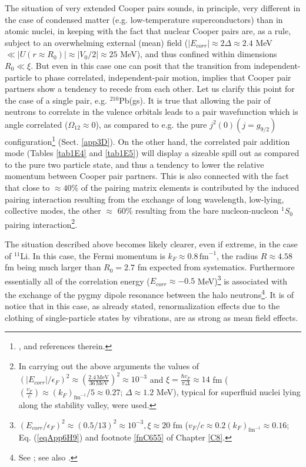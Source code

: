 The situation of very extended Cooper pairs sounds, in principle, very different in the case of condensed matter (e.g. low-temperature superconductors) than in atomic nuclei, in keeping with the fact that nuclear Cooper pairs are, as a rule, subject to an overwhelming external (mean) field ($|E_{corr}|\approx 2\Delta\approx2.4$ MeV $\ll |U(r\approx R_0)|\approx |V_0/2|\approx 25 $ MeV), and thus confined within dimensions $R_0\ll\xi$. But even in this case one can posit that  the transition from independent-particle to phase correlated, independent-pair motion, implies that Cooper pair partners show a tendency to recede from each other. Let us clarify this point for the case of a single pair, e.g. $^{210}$Pb(gs). It is true that allowing the pair of neutrons to correlate in the valence orbitals leads to a pair wavefunction which is angle correlated ($\Omega_{12}\approx 0$), as compared to e.g. the pure $j^2(0)(j=g_{9/2})$ configuration\footnote{\label{C4f17}\cite{Bertsch:67}, \cite{Ferreira:84,Matsuo:13} and references therein.} (Sect. \ref{app3D}). On the other hand, the correlated pair addition mode (Tables \ref{tab1E4} and \ref{tab1E5}) will display a sizeable spill out as compared to the pure two particle state, and thus a tendency to lower the relative momentum  between Cooper pair partners. This is also connected with the fact that close to $\approx 40$\% of the pairing matrix elements is contributed by the induced pairing interaction resulting from the exchange of long wavelength, low-lying, collective modes, the other $\approx$ 60\% resulting from the bare nucleon-nucleon $^1S_0$ pairing interaction\footnote{\label{f17C4} In carrying out the above arguments the values of $(|E_{corr}|/\epsilon_F)^2\approx \left(\frac{2.4 \,\text{MeV}}{36\,\text{MeV}}\right)^2\approx 10^{-3}$ and $\xi=\frac{\hbar v_F}{\pi\Delta}\approx 14$ fm ($(\frac{v_F}{c})\approx (k_F)_{\text{fm}^{-1}}/5\approx 0.27$; $\Delta\approx 1.2$ MeV), typical for superfluid nuclei lying along the stability valley, were used.}. 


The situation described above becomes likely clearer, even if extreme, in the case of $^{11}$Li. In this case, the Fermi momentum is $k_F\approx 0.8\, \text{fm}^{-1}$, the radius $R\approx 4.58 $fm being much larger than $R_0=2.7$ fm expected from systematics. Furthermore essentially all of the correlation energy ($E_{corr}\approx -0.5$ MeV)\footnote{\label{f18C4} $(E_{corr}/\epsilon_F)^2\approx (0.5/13)^2\approx 10^{-3}, \xi\approx 20 $ fm ($v_F/c\approx0.2(k_F)_{\text{fm}^{-1}}\approx 0.16$; Eq. (\ref{eqApp6H9}) and footnote \ref{fnC655} of Chapter \ref{C8}.}  is associated with the exchange of the  pygmy dipole resonance between the halo neutrons\footnote{See \cite{Barranco:01}; see also \cite{Broglia:19}.}. It is of notice that in this case, as already stated, renormalization effects due to the clothing of single-particle states by vibrations, are as strong as mean field effects.
\clearpage


